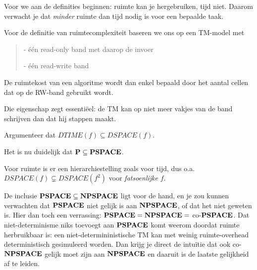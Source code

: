 Voor we aan de definities beginnen: ruimte kan je hergebruiken, tijd
niet. Daarom verwacht je dat {\em minder} ruimte dan tijd nodig is
voor een bepaalde taak.

Voor de definitie van ruimtecomplexiteit baseren we ons op een
TM-model met
\begin{verse}
- \'{e}\'{e}n read-only band met daarop de invoer

- \'{e}\'{e}n read-write band
\end{verse}
De ruimtekost van een algoritme wordt dan enkel bepaald door het
aantal cellen dat op de RW-band gebruikt wordt.



Die eigenschap zegt essenti\"eel: de TM kan op niet meer vakjes van de
band schrijven dan dat hij stappen maakt.

Argumenteer dat $DTIME(f) \subseteq DSPACE(f)$. 



Het is nu duidelijk dat ${\bf P} \subseteq {\bf PSPACE}$.

Voor ruimte is er een hierarchiestelling zoals voor tijd, dus o.a.
$DSPACE(f) \subsetneq DSPACE(f^2)$ voor {\em fatsoenlijke} $f$.


De inclusie ${\bf PSPACE} \subseteq {\bf NPSPACE}$ ligt voor de hand, en je zou
kunnen verwachten dat ${\bf PSPACE}$ niet gelijk is aan ${\bf NPSPACE}$, of dat het
niet geweten is. Hier dan toch een verrassing: ${\bf PSPACE} = {\bf NPSPACE} =$
co-${\bf PSPACE}$. Dat niet-determinisme niks toevoegt aan ${\bf PSPACE}$ komt
weerom doordat ruimte herbruikbaar is: een niet-determininistische TM
kan met weinig ruimte-overhead deterministisch gesimuleerd worden. Dan
krijg je direct de intu\"itie dat ook co-${\bf NPSPACE}$ gelijk moet zijn
aan ${\bf NPSPACE}$ en daaruit is de laatste gelijkheid af te leiden.

